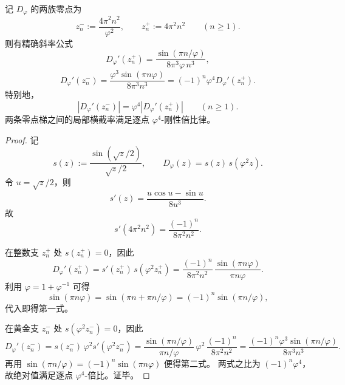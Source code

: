 \begin{theorem}[双零点梯的逐点斜率刚性]\label{thm:xi-time-part9zbm-foldpi-pointwise-slope-rigidity}
记 \(D_\varphi\) 的两族零点为
\[
z_n^-:=\frac{4\pi^2n^2}{\varphi^2},
\qquad
z_n^+:=4\pi^2n^2
\qquad (n\ge 1).
\]
则有精确斜率公式
\[
D_\varphi'(z_n^+)
=
\frac{\sin(\pi n/\varphi)}{8\pi^3\varphi\,n^3},
\]
\[
D_\varphi'(z_n^-)
=
\frac{\varphi^3\sin(\pi n\varphi)}{8\pi^3 n^3}
=
(-1)^n\varphi^4 D_\varphi'(z_n^+).
\]
特别地，
\[
|D_\varphi'(z_n^-)|=\varphi^4 |D_\varphi'(z_n^+)|
\qquad (n\ge 1).
\]
两条零点梯之间的局部横截率满足逐点 \(\varphi^4\)-刚性倍比律。
\end{theorem}
\begin{proof}
记
\[
s(z):=\frac{\sin(\sqrt z/2)}{\sqrt z/2},
\qquad
D_\varphi(z)=s(z)\,s(\varphi^2 z).
\]
令 \(u=\sqrt z/2\)，则
\[
s'(z)=\frac{u\cos u-\sin u}{8u^3}.
\]
故
\[
s'(4\pi^2n^2)=\frac{(-1)^n}{8\pi^2n^2}.
\]

在整数支 \(z_n^+\) 处 \(s(z_n^+)=0\)，因此
\[
D_\varphi'(z_n^+)
=
s'(z_n^+)\,s(\varphi^2 z_n^+)
=
\frac{(-1)^n}{8\pi^2n^2}\,\frac{\sin(\pi n\varphi)}{\pi n\varphi}.
\]
利用 \(\varphi=1+\varphi^{-1}\) 可得
\[
\sin(\pi n\varphi)=\sin(\pi n+\pi n/\varphi)=(-1)^n\sin(\pi n/\varphi),
\]
代入即得第一式。

在黄金支 \(z_n^-\) 处 \(s(\varphi^2 z_n^-)=0\)，因此
\[
D_\varphi'(z_n^-)
=
s(z_n^-)\,\varphi^2 s'(\varphi^2 z_n^-)
=
\frac{\sin(\pi n/\varphi)}{\pi n/\varphi}\,\varphi^2\,\frac{(-1)^n}{8\pi^2n^2}
=
\frac{(-1)^n\varphi^3\sin(\pi n/\varphi)}{8\pi^3n^3}.
\]
再用 \(\sin(\pi n/\varphi)=(-1)^n\sin(\pi n\varphi)\) 便得第二式。
两式之比为 \((-1)^n\varphi^4\)，故绝对值满足逐点 \(\varphi^4\)-倍比。证毕。
\end{proof}

